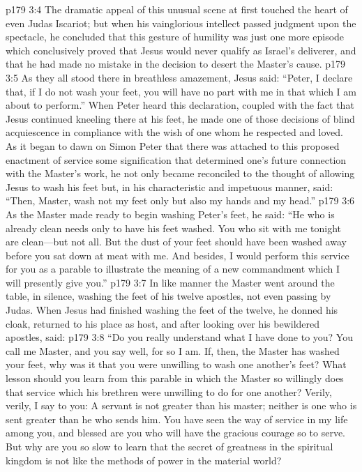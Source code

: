 \vs p179 3:4 The dramatic appeal of this unusual scene at first touched the heart of even Judas Iscariot; but when his vainglorious intellect passed judgment upon the spectacle, he concluded that this gesture of humility was just one more episode which conclusively proved that Jesus would never qualify as Israel’s deliverer, and that he had made no mistake in the decision to desert the Master’s cause.
\vs p179 3:5 As they all stood there in breathless amazement, Jesus said: \textcolor{ubdarkred}{“Peter, I declare that, if I do not wash your feet, you will have no part with me in that which I am about to perform.”} When Peter heard this declaration, coupled with the fact that Jesus continued kneeling there at his feet, he made one of those decisions of blind acquiescence in compliance with the wish of one whom he respected and loved. As it began to dawn on Simon Peter that there was attached to this proposed enactment of service some signification that determined one’s future connection with the Master’s work, he not only became reconciled to the thought of allowing Jesus to wash his feet but, in his characteristic and impetuous manner, said: “Then, Master, wash not my feet only but also my hands and my head.”
\vs p179 3:6 As the Master made ready to begin washing Peter’s feet, he said: \textcolor{ubdarkred}{“He who is already clean needs only to have his feet washed. You who sit with me tonight are clean---but not all. But the dust of your feet should have been washed away before you sat down at meat with me. And besides, I would perform this service for you as a parable to illustrate the meaning of a new commandment which I will presently give you.”}
\vs p179 3:7 In like manner the Master went around the table, in silence, washing the feet of his twelve apostles, not even passing by Judas. When Jesus had finished washing the feet of the twelve, he donned his cloak, returned to his place as host, and after looking over his bewildered apostles, said:\plusone
\pc \vs p179 3:8 \textcolor{ubdarkred}{“Do you really understand what I have done to you? You call me Master, and you say well, for so I am. If, then, the Master has washed your feet, why was it that you were unwilling to wash one another’s feet? What lesson should you learn from this parable in which the Master so willingly does that service which his brethren were unwilling to do for one another? Verily, verily, I say to you: A servant is not greater than his master; neither is one who is sent greater than he who sends him. You have seen the way of service in my life among you, and blessed are you who will have the gracious courage so to serve. But why are you so slow to learn that the secret of greatness in the spiritual kingdom is not like the methods of power in the material world?}

